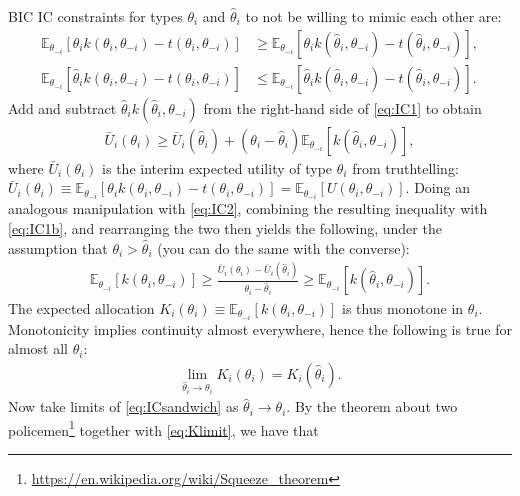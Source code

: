 \documentclass[a4paper]{article}
\begin{document}
	BIC IC constraints for types $\theta_i$ and $\hat{\theta}_i$ to not be willing to mimic each other are:
	\begin{align}
		\mathbb{E}_{\theta_{-i}}\left[ \theta_{i} k(\theta_i,\theta_{-i}) - t(\theta_i,\theta_{-i}) \right] &\geq 
		\mathbb{E}_{\theta_{-i}}\left[ \theta_{i} k(\hat{\theta}_i,\theta_{-i}) - t(\hat{\theta}_i,\theta_{-i}) \right],
		\label{eq:IC1}
		\\
		\mathbb{E}_{\theta_{-i}}\left[ \hat{\theta}_{i} k(\theta_i,\theta_{-i}) - t(\theta_i,\theta_{-i}) \right] &\leq 
		\mathbb{E}_{\theta_{-i}}\left[ \hat{\theta}_{i} k(\hat{\theta}_i,\theta_{-i}) - t(\hat{\theta}_i,\theta_{-i}) \right].
		\label{eq:IC2}
	\end{align}
	Add and subtract $\hat{\theta}_{i} k(\hat{\theta}_i,\theta_{-i})$ from the right-hand side of \eqref{eq:IC1} to obtain
	\begin{align}
		\bar{U}_i(\theta_i) \geq \bar{U}_i(\hat{\theta}_i) + (\theta_i - \hat{\theta}_i) \mathbb{E}_{\theta_{-i}}\left[ k(\hat{\theta}_i,\theta_{-i}) \right], \label{eq:IC1b}
	\end{align}
	where $\bar{U}_i(\theta_i)$ is the interim expected utility of type $\theta_i$ from truthtelling: $\bar{U}_i(\theta_i) \equiv \mathbb{E}_{\theta_{-i}}\left[ \theta_{i} k(\theta_i,\theta_{-i}) - t(\theta_i,\theta_{-i}) \right] = \mathbb{E}_{\theta_{-i}}\left[ U(\theta_i,\theta_{-i}) \right]$.
	Doing an analogous manipulation with \eqref{eq:IC2}, combining the resulting inequality with \eqref{eq:IC1b}, and rearranging the two then yields the following, under the assumption that $\theta_i > \hat{\theta}_i$ (you can do the same with the converse):
	\begin{align}
		\mathbb{E}_{\theta_{-i}}\left[ k(\theta_i,\theta_{-i}) \right] \geq \frac{\bar{U}_i(\theta_i) - \bar{U}_i(\hat{\theta}_i)}{\theta_i - \hat{\theta}_i} \geq \mathbb{E}_{\theta_{-i}}\left[ k(\hat{\theta}_i,\theta_{-i}) \right] .
		\label{eq:ICsandwich}
	\end{align}
	The expected allocation $K_i(\theta_i) \equiv \mathbb{E}_{\theta_{-i}}\left[ k(\theta_i,\theta_{-i}) \right]$ is thus monotone in $\theta_i$. Monotonicity implies continuity almost everywhere, hence the following is true for almost all $\theta_i$:
	\begin{align}
		\lim_{\hat{\theta}_i \to \theta_i} K_i(\theta_i) = K_i(\hat{\theta}_i).
		\label{eq:Klimit}
	\end{align}
	Now take limits of \eqref{eq:ICsandwich} as $\hat{\theta}_i \to \theta_i$. By the theorem about two policemen\footnote{\url{https://en.wikipedia.org/wiki/Squeeze_theorem}} together with \eqref{eq:Klimit}, we have that
\end{document}
